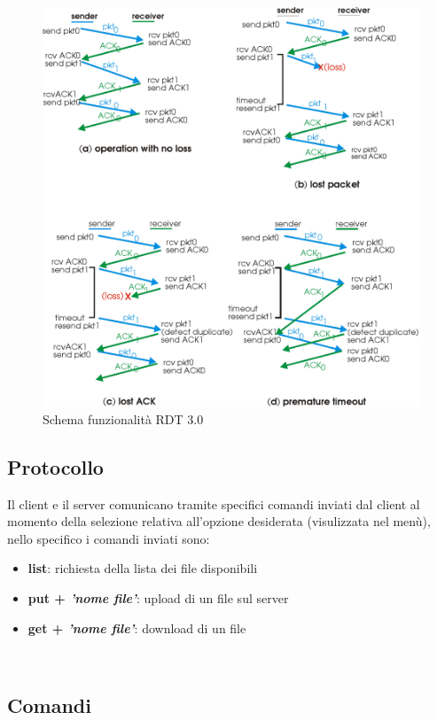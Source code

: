 \documentclass{article}
\begin{document}
\begin{figure}[!htb]
  \includegraphics[width=\linewidth]{rdtFigure.png}
  \caption{Schema funzionalità RDT 3.0}
\end{figure}

\subsection{Protocollo}

Il client e il server comunicano tramite specifici comandi inviati dal client al momento della selezione relativa all'opzione desiderata (visulizzata nel menù), nello specifico i comandi inviati sono:
\begin{itemize}
    \item \textbf{list}: richiesta della lista dei file disponibili
    \item \textbf{put + \textit{'nome file'}}: upload di un file sul server
    \item \textbf{get + \textit{'nome file'}}: download di un file
\end{itemize}

\ \\

\subsection{Comandi}
\end{document}

